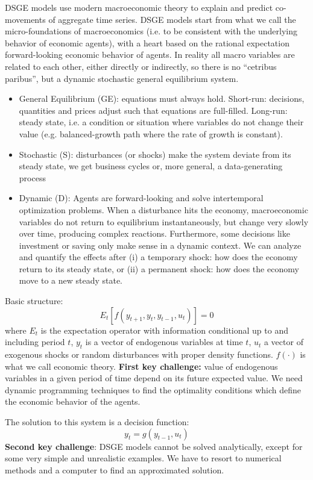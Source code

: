 \begin{Solution}{1}
	DSGE models use modern macroeconomic theory to explain and predict co-movements of aggregate time series. DSGE models start from what we call the micro-foundations of macroeconomics (i.e. to be consistent with the underlying behavior of economic agents), with a heart based on the rational expectation forward-looking economic behavior of agents. In reality all macro variables are related to each other, either directly or indirectly, so there is no \enquote{cetribus paribus}, but a dynamic stochastic general equilibrium system.
	\begin{itemize}
		\item General Equilibrium (GE): equations must always hold. Short-run: decisions, quantities and prices adjust such that equations are full-filled. Long-run: steady state, i.e. a condition or situation where variables do not change their value (e.g. balanced-growth path where the rate of growth is constant).
		\item Stochastic (S): disturbances (or shocks) make the system deviate from its steady state, we get business cycles or, more general, a data-generating process
		\item Dynamic (D): Agents are forward-looking and solve intertemporal optimization problems. When a disturbance hits the economy, macroeconomic variables do not return to equilibrium instantaneously, but change very slowly over time, producing complex reactions. Furthermore, some decisions like investment or saving only make sense in a dynamic context. We can analyze and quantify the effects after (i) a temporary shock: how does the economy return to its steady state, or (ii) a permanent shock: how does the economy move to a new steady state.
	\end{itemize}
	Basic structure:
	$$ E_t \left[f(y_{t+1}, y_t, y_{t-1},u_t)\right]=0$$
	where $E_t$ is the expectation operator with information conditional up to and including period $t$, $y_t$ is a vector of endogenous variables at time $t$, $u_t$ a vector of exogenous shocks or random disturbances with proper density functions. $f(\cdot)$ is what we call economic theory. \textbf{First key challenge:} value of endogenous variables in a given period of time depend on its future expected value. We need dynamic programming techniques to find the optimality conditions which define the economic behavior of the agents.

	The solution to this system is a decision function:
	$$y_t = g(y_{t-1},u_t)$$ \textbf{Second key challenge}: DSGE models cannot be solved analytically, except for some very simple and unrealistic examples. We have to resort to numerical methods and a computer to find an approximated solution.


\end{Solution}
